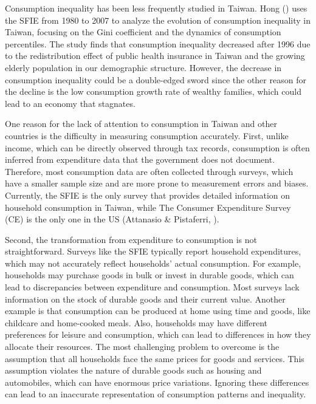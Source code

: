 \documentclass{article}
\begin{document}
Consumption inequality has been less frequently studied in Taiwan. Hong (\citeyear{TW_consumption_inequality}) uses the SFIE from 1980 to 2007 to analyze the evolution of consumption inequality in Taiwan, focusing on the Gini coefficient and the dynamics of consumption percentiles.
The study finds that consumption inequality decreased after 1996 due to the redistribution effect of public health insurance in Taiwan and the growing elderly population in our demographic structure.
However, the decrease in consumption inequality could be a double-edged sword since the other reason for the decline is the low consumption growth rate of wealthy families, which could lead to an economy that stagnates.

One reason for the lack of attention to consumption in Taiwan and other countries is the difficulty in measuring consumption accurately.
First, unlike income, which can be directly observed through tax records, consumption is often inferred from expenditure data that the government does not document.
Therefore, most consumption data are often collected through surveys, which have a smaller sample size and are more prone to measurement errors and biases.
Currently, the SFIE is the only survey that provides detailed information on household consumption in Taiwan, while The Consumer Expenditure Survey (CE) is the only one in the US (Attanasio \& Pistaferri, \citeyear{JEP_Consumption_Inequality}).

Second, the transformation from expenditure to consumption is not straightforward. Surveys like the SFIE typically report household expenditures, which may not accurately reflect households' actual consumption.
For example, households may purchase goods in bulk or invest in durable goods, which can lead to discrepancies between expenditure and consumption. Most surveys lack information on the stock of durable goods and their current value.
Another example is that consumption can be produced at home using time and goods, like childcare and home-cooked meals. Also, households may have different preferences for leisure and consumption, which can lead to differences in how they allocate their resources.
The most challenging problem to overcome is the assumption that all households face the same prices for goods and services. This assumption violates the nature of durable goods such as housing and automobiles, which can have enormous price variations. Ignoring these differences can lead to an inaccurate representation of consumption patterns and inequality.
\end{document}
